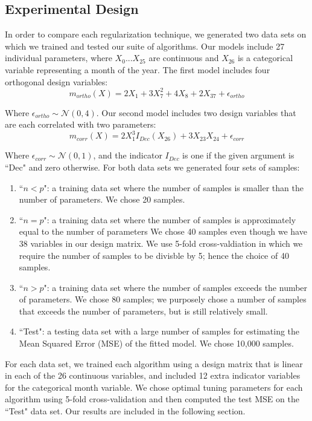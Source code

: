 \documentclass[11pt]{article}
\begin{document}
\subsection{Experimental Design}
In order to compare each regularization technique, we generated two data sets on which we trained and tested our suite of algorithms.  Our models include 27 individual parameters, where $X_0 ... X_{25}$ are continuous and $X_{26}$ is a categorical variable representing a month of the year.  The first model includes four orthogonal design variables:
	$$m_{ortho}(X) = 2X_1 + 3X_7^2 + 4X_8 + 2X_{37} + \epsilon_{ortho}$$

Where $\epsilon_{ortho} \sim \mathcal{N}(0,4)$.  Our second model includes two design variables that are each correlated with two parameters:
	$$m_{corr}(X) = 2X_1^3I_{Dec}(X_{26}) + 3X_{23}X_{24} + \epsilon_{corr}$$

Where $\epsilon_{corr} \sim \mathcal{N}(0,1)$, and the indicator $I_{Dec}$ is one if the given argument is ``Dec" and zero otherwise.  For both data sets we generated four sets of samples:
\begin{enumerate}
	\item ``$n<p$": a training data set where the number of samples is smaller than the number of parameters.  We chose 20 samples.  
	\item ``$n=p$": a training data set where the number of samples is approximately equal to the number of parameters  We chose 40 samples even though we have 38 variables in our design matrix.  We use 5-fold cross-valdiation in which we require the number of samples to be divisble by 5; hence the choice of 40 samples.  
	\item ``$n>p$": a training data set where the number of samples exceeds the number of parameters.  We chose 80 samples; we purposely chose a number of samples that exceeds the number of parameters, but is still relatively small.  
	\item ``Test": a testing data set with a large number of samples for estimating the Mean Squared Error (MSE) of the fitted model.  We chose 10,000 samples.  
\end{enumerate}

For each data set, we trained each algorithm using a design matrix that is linear in each of the 26 continuous variables, and included 12 extra indicator variables for the categorical month variable.  We chose optimal tuning parameters for each algorithm using 5-fold cross-validation and then computed the test MSE on the ``Test" data set.  Our results are included in the following section.  
\end{document}
